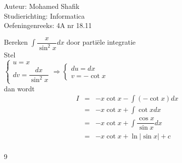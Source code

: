 \documentclass[a4paper]{article}
\begin{document}
\noindent \large Auteur: Mohamed Shafik \\
\noindent \large Studierichting: Informatica\\
\noindent \large Oefeningenreeks: 4A nr 18.11\\

\medskip

\normalsize

Bereken $\displaystyle\int \dfrac{x}{\sin^2 x} dx$ door parti\"ele integratie\\

Stel\\

$\left\{\begin{array}{l} u = x \\ dv = \dfrac{dx}{\sin^2 x} \end{array}\right. \Rightarrow \left\{\begin{array}{l} du = dx \\ v = -\cot x \end{array}\right.$\\

dan wordt\\

\begin{eqnarray*}
I &=& -x \cot x - \displaystyle\int (-\cot x) dx\\
&=& -x \cot x + \displaystyle\int \cot x dx\\
&=& -x \cot x + \displaystyle\int \dfrac{\cos x}{\sin x} dx\\
&=& -x \cot x + \ln|\sin x| + c\\
\end{eqnarray*}

\begin{thebibliography}{9}
\end{thebibliography}
\end{document}
